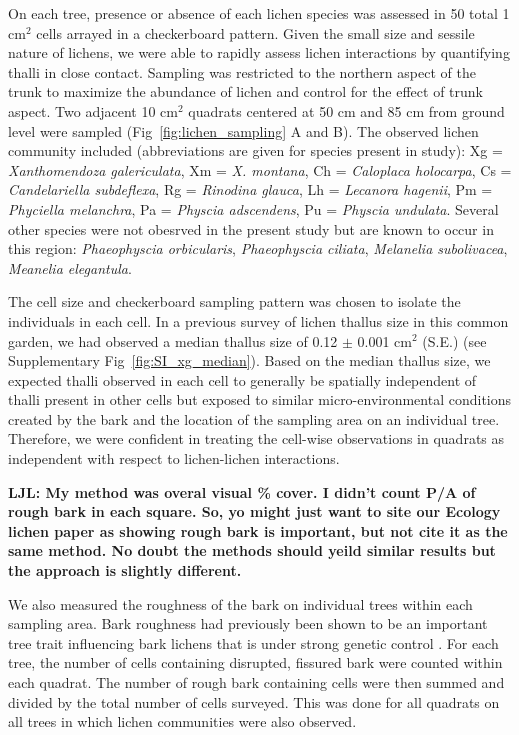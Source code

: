 \documentclass[9pt,twocolumn,twoside,lineno]{pnas-new}
\begin{document}
{On each tree, presence or absence of each lichen species was assessed
in 50 total 1 cm$^2$ cells arrayed in a checkerboard pattern. Given
the small size and sessile nature of lichens, we were able to rapidly
assess lichen interactions by quantifying thalli in close
contact. Sampling was restricted to the northern aspect of the trunk
to maximize the abundance of lichen and control for the effect of
trunk aspect. Two adjacent 10 cm$^2$ quadrats centered at 50 cm and 85
cm from ground level were sampled (Fig~\ref{fig:lichen_sampling} A and
B). The observed lichen community included (abbreviations are given
for species present in study): Xg = \textit{Xanthomendoza
  galericulata}, Xm = \textit{X. montana}, Ch = \textit{Caloplaca
  holocarpa}, Cs = \textit{Candelariella subdeflexa}, Rg =
\textit{Rinodina glauca}, Lh = \textit{Lecanora hagenii}, Pm =
\textit{Phyciella melanchra}, Pa = \textit{Physcia adscendens}, Pu =
\textit{Physcia undulata}. Several other species were not obesrved in
the present study but are known to occur in this region:
\textit{Phaeophyscia orbicularis}, \textit{Phaeophyscia ciliata},
\textit{Melanelia subolivacea}, \textit{Meanelia elegantula}.


The cell size and checkerboard sampling pattern was chosen to isolate
the individuals in each cell. In a previous survey of lichen thallus
size in this common garden, we had observed a median thallus size of
0.12 $\pm$ 0.001 cm$^2$ (S.E.) (see Supplementary
Fig~\ref{fig:SI_xg_median}). Based on the median thallus size, we
expected thalli observed in each cell to generally be spatially
independent of thalli present in other cells but exposed to similar
micro-environmental conditions created by the bark and the location of
the sampling area on an individual tree. Therefore, we were confident
in treating the cell-wise observations in quadrats as independent with
respect to lichen-lichen interactions.

\textbf{LJL: My method was overal visual \% cover. I didn’t count P/A
  of rough bark in each square. So, yo might just want to site our
  Ecology lichen paper as showing rough bark is important, but not
  cite it as the same method. No doubt the methods should yeild
  similar results but the approach is slightly different.}


We also measured the roughness of the bark on individual trees within
each sampling area. Bark roughness had previously been shown to be an
important tree trait influencing bark lichens \cite{Lamit2011} that is
under strong genetic control \cite{Bdeir2017}. For each tree, the
number of cells containing disrupted, fissured bark were counted
within each quadrat. The number of rough bark containing cells were
then summed and divided by the total number of cells surveyed. This
was done for all quadrats on all trees in which lichen communities
were also observed.

}
\end{document}
